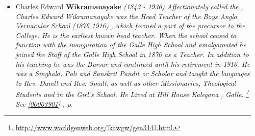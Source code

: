\documentclass[10pt, openany]{book}
\begin{document}
\begin{itemize}
{\begin{itemize}
{\begin{itemize}
{\begin{itemize}
{ }
\item{Albert \textbf{Wikramanayake} \textcolor{gray}{\textit{(b. 187?)}}
 }
\item{Edwin \textbf{Wikramanayake} \textcolor{gray}{\textit{(b. 187?)}}
\begin{itemize}
\item{\textit{m.} Unknown \textbf{Ranawake} \textcolor{gray}{\textit{(b. 188?)}}   \label{couple:00003896:00003897} \begin{itemize}
\item{Daughter \textbf{Wikramanayake} \textcolor{gray}{\textit{(b. 191?)}}
 }
\item{Son \textbf{Wikramanayake} \textcolor{gray}{\textit{(b. 191?)}}
 }
\item{Son \textbf{Wikramanayake} \textcolor{gray}{\textit{(b. 191?)}}
 }
\end{itemize}}
\end{itemize}
 }
\end{itemize}}
\end{itemize}
 }
\item{Charles Edward \textbf{Wikramanayake} \textcolor{slorange}{\textit{(1843 - 1936)}} \textcolor{slmaroon}{\textit{Affectionately called the , Charles Edward Wikramanayake was the Head Teacher of the Boys Anglo Vernacular School (1876  1916) , which formed a part of the precursor to the College. He is the earliest known head teacher. When the school ceased to function with the inauguration of the Galle High School and amalgamated he joined the Staff of the Galle High School in 1876 as a Teacher. In addition to his teaching he was the Bursar and continued until his retirement in 1916. He was a Singhala, Pali and Sanskrit Pandit or Scholar and taught the languages to Rev. Darell and Rev. Small, as well as other Missionaries, Theological Students and in the Girl's School. He Lived at Hill House Kalegana , Galle.
\footnote{\url{http://www.worldgenweb.org/lkawgw/gen3141.html.}}}} \textcolor{slteal}{\textit{See  \autoref{00003901} \textit{, p. \pageref{00003901} }}}}
\end{itemize}}
\end{itemize}
    
\end{document}
